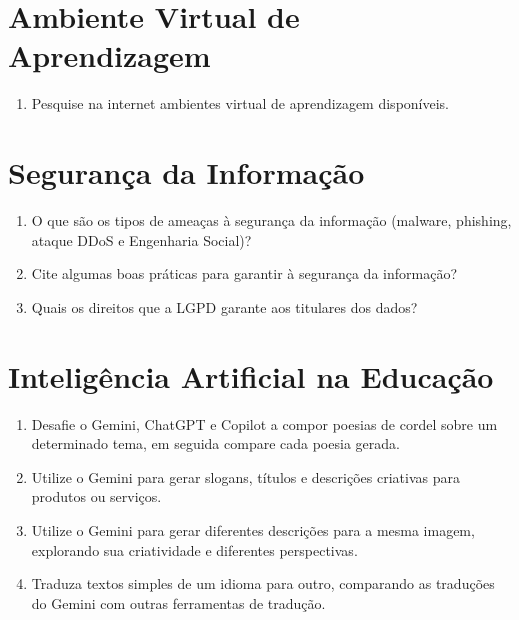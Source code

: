 \documentclass[11pt]{article}
\begin{document}
\section{Ambiente Virtual de Aprendizagem}

	\begin{enumerate}
		\item Pesquise na internet ambientes virtual de aprendizagem disponíveis. 
	\end{enumerate}


\section{Segurança da Informação}

	\begin{enumerate}
		\item O que são os tipos de ameaças à segurança da informação (malware, phishing, ataque DDoS e Engenharia Social)?
		\item Cite algumas boas práticas para garantir à segurança da informação?
		\item Quais os direitos que a LGPD garante aos titulares dos dados?
	\end{enumerate}

\section{Inteligência Artificial na Educação}

\begin{enumerate}
		\item Desafie o Gemini, ChatGPT e Copilot a compor poesias de cordel sobre um determinado tema, em seguida compare cada poesia gerada.
		\item Utilize o Gemini para gerar slogans, títulos e descrições criativas para produtos ou serviços.
		\item Utilize o Gemini para gerar diferentes descrições para a mesma imagem, explorando sua criatividade e diferentes perspectivas.
		\item Traduza textos simples de um idioma para outro, comparando as traduções do Gemini com outras ferramentas de tradução.
\end{enumerate}
\end{document}
